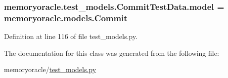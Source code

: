 \subsubsection[{model}]{\setlength{\rightskip}{0pt plus 5cm}memoryoracle.\+test\+\_\+models.\+Commit\+Test\+Data.\+model = {\bf memoryoracle.\+models.\+Commit}\hspace{0.3cm}{\ttfamily [static]}}\label{classmemoryoracle_1_1test__models_1_1CommitTestData_a1d7335c322637a6769200489933b9338}


Definition at line 116 of file test\+\_\+models.\+py.



The documentation for this class was generated from the following file\+:\begin{DoxyCompactItemize}
\item 
memoryoracle/\hyperlink{test__models_8py}{test\+\_\+models.\+py}\end{DoxyCompactItemize}
